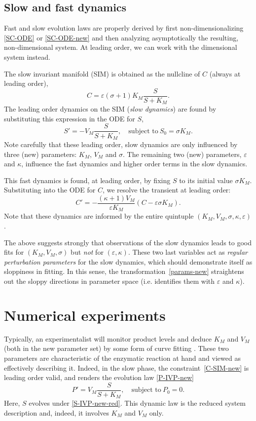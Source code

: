 \documentclass[11pt]{article}
\newcommand{\eps}{\varepsilon}
\newcommand{\be}{\begin{equation}}
\newcommand{\ee}{\end{equation}}
\begin{document}
\subsection{Slow and fast dynamics}
%
Fast and slow evolution laws are properly derived
by first non-dimensionalizing \eqref{SC-ODE} or \eqref{SC-ODE-new}
and then analyzing asymptotically the resulting, non-dimensional system.
At leading order, we can work with the dimensional system instead.

The slow invariant manifold (SIM) is obtained
as the nullcline of $C$ (always at leading order),
%
\be
 C = \eps (\sigma + 1) K_M \frac{S}{S + K_M} .
\label{C-SIM-new}
\ee
%
The leading order dynamics on the SIM (\textit{slow dynamics})
are found by substituting this expression in the ODE for $S$,
%
\be
 S' = -V_M \frac{S}{S + K_M} ,
\quad\mbox{subject to}\
 S_0 = \sigma K_M .
\label{S-IVP-new-red}
\ee
%
Note carefully that these leading order, slow dynamics
are only influenced by three (new) parameters:
$K_M$, $V_M$ and $\sigma$.
The remaining two (new) parameters,
$\eps$ and $\kappa$,
influence the fast dynamics
and higher order terms in the slow dynamics.

This fast dynamics is found, at leading order,
by fixing $S$ to its initial value $\sigma K_M$.
Substituting into the ODE for $C$,
we resolve the transient at leading order:
%
\[
 C'
=
 -\frac{(\kappa+1)V_M}{\eps K_M} (C - \eps\sigma K_M) .
\]
%
Note that these dynamics are informed by the entire quintuple
$(K_M,V_M,\sigma,\kappa,\eps)$.

The above suggests strongly that observations of the slow dynamics
leads to good fits for $(K_M,V_M,\sigma)$
but \emph{not} for $(\eps,\kappa)$.
These two last variables act as
\emph{regular perturbation parameters} for the slow dynamics,
which should demonstrate itself as sloppiness in fitting.
In this sense, the transformation~\eqref{params-new}
straightens out the sloppy directions in parameter space
(i.e. identifies them with $\eps$ and $\kappa$).

\section{Numerical experiments}
%
Typically, an experimentalist will monitor product levels
and deduce $K_M$ and $V_M$ (both in the new parameter set)
by some form of curve fitting \cite{JG11,LB34,MM13}.
These two parameters are characteristic
of the enzymatic reaction at hand
and viewed as effectively describing it.
Indeed, in the slow phase,
the constraint~\eqref{C-SIM-new} is leading order valid,
and renders the evolution law \eqref{P-IVP-new}
%
\be
 P' = V_M \frac{S}{S + K_M} ,
\quad\mbox{subject to}\
 P_0 = 0 .
\label{P-ODE-new-red}
\ee
%
Here, $S$ evolves under \eqref{S-IVP-new-red}.
This dynamic law is the reduced system description and,
indeed, it involves $K_M$ and $V_M$ only.
\end{document}
